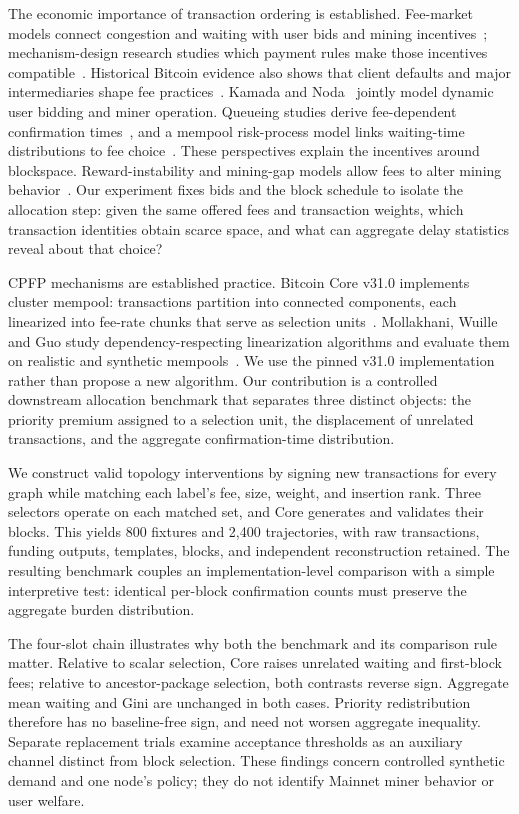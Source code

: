 \documentclass[conference]{IEEEtran}
\begin{document}
The economic importance of transaction ordering is established. Fee-market models connect congestion and waiting with user bids and mining incentives~\cite{easley2019,huberman2021}; mechanism-design research studies which payment rules make those incentives compatible~\cite{roughgarden2024,stablefees2023}. Historical Bitcoin evidence also shows that client defaults and major intermediaries shape fee practices~\cite{moser2015}. Kamada and Noda~\cite{kamada2025} jointly model dynamic user bidding and miner operation. Queueing studies derive fee-dependent confirmation times~\cite{kasahara2019,kawase2020}, and a mempool risk-process model links waiting-time distributions to fee choice~\cite{gundlach2024}. These perspectives explain the incentives around blockspace. Reward-instability and mining-gap models allow fees to alter mining behavior~\cite{carlsten2016,tsabary2018}. Our experiment fixes bids and the block schedule to isolate the allocation step: given the same offered fees and transaction weights, which transaction identities obtain scarce space, and what can aggregate delay statistics reveal about that choice?

CPFP mechanisms are established practice. Bitcoin Core v31.0 implements cluster mempool: transactions partition into connected components, each linearized into fee-rate chunks that serve as selection units~\cite{bitcoin_core31,core_design31}. Mollakhani, Wuille and Guo study dependency-respecting linearization algorithms and evaluate them on realistic and synthetic mempools~\cite{linearization2026}. We use the pinned v31.0 implementation rather than propose a new algorithm. Our contribution is a controlled downstream allocation benchmark that separates three distinct objects: the priority premium assigned to a selection unit, the displacement of unrelated transactions, and the aggregate confirmation-time distribution.

We construct valid topology interventions by signing new transactions for every graph while matching each label's fee, size, weight, and insertion rank. Three selectors operate on each matched set, and Core generates and validates their blocks. This yields 800 fixtures and 2,400 trajectories, with raw transactions, funding outputs, templates, blocks, and independent reconstruction retained. The resulting benchmark couples an implementation-level comparison with a simple interpretive test: identical per-block confirmation counts must preserve the aggregate burden distribution.

The four-slot chain illustrates why both the benchmark and its comparison rule matter. Relative to scalar selection, Core raises unrelated waiting and first-block fees; relative to ancestor-package selection, both contrasts reverse sign. Aggregate mean waiting and Gini are unchanged in both cases. Priority redistribution therefore has no baseline-free sign, and need not worsen aggregate inequality. Separate replacement trials examine acceptance thresholds as an auxiliary channel distinct from block selection. These findings concern controlled synthetic demand and one node's policy; they do not identify Mainnet miner behavior or user welfare.
\end{document}
